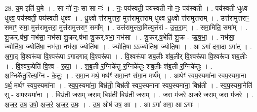 \documentclass[17pt]{extarticle}
\begin{document}
28. य॒म इति॑ य॒मे । . सा नो॑ नः॒ सा सा नः॑ । . नः॒ पय॑स्वती॒ पय॑स्वती नो नः॒ पय॑स्वती । . पय॑स्वती धुक्ष्व धुक्ष्व॒ पय॑स्वती॒ पय॑स्वती धुक्ष्व । . धु॒क्ष्वो त्त॑रामुत्तरा॒ मुत्त॑रामुत्तराम् धुक्ष्व धु॒क्ष्वो त्त॑रामुत्तराम् । . उत्त॑रामुत्तराꣳ॒॒ समाꣳ॒॒ समा॒ मुत्त॑रामुत्तरा॒ मुत्त॑रामुत्तराꣳ॒॒ समा᳚म् । . उत्त॑रामुत्तरा॒मित्युत्त॑रां - उ॒त्त॒रा॒म् । . समा॒मिति॒ समा᳚म् । . शु॒क्रर्.ष॑भा॒ नभ॑सा॒ नभ॑सा शु॒क्रर्.ष॑भा शु॒क्रर्.ष॑भा॒ नभ॑सा । . शु॒क्रर्.ष॒भेति॑ शु॒क्र - ऋ॒ष॒भा॒ । . नभ॑सा॒ ज्योति॑षा॒ ज्योति॑षा॒ नभ॑सा॒ नभ॑सा॒ ज्योति॑षा । . ज्योति॒षा ऽऽज्योति॑षा॒ ज्योति॒षा । . आ ऽगा॑ दगा॒दा ऽगा᳚त् । . अ॒गा॒द् वि॒श्वरू॑पा वि॒श्वरू॑पा ऽगादगाद् वि॒श्वरू॑पा । . वि॒श्वरू॑पा शब॒लीः श॑ब॒लीर् वि॒श्वरू॑पा वि॒श्वरू॑पा शब॒लीः । . वि॒श्वरू॒पेति॑ वि॒श्व - रू॒पा॒ । . श॒ब॒ली र॒ग्निके॑तु र॒ग्निके॑तुः शब॒लीः श॑ब॒ली र॒ग्निके॑तुः । . अ॒ग्निके॑तु॒रित्य॒ग्नि - के॒तुः॒ । . स॒मा॒न मर्थ॒ मर्थꣳ॑ समा॒नꣳ स॑मा॒न मर्थ᳚म् । . अर्थꣳ॑ स्वप॒स्यमा॑ना स्वप॒स्यमा॒ना ऽर्थ॒ मर्थꣳ॑ स्वप॒स्यमा॑ना । . स्व॒प॒स्यमा॑ना॒ बिभ्र॑ती॒ बिभ्र॑ती स्वप॒स्यमा॑ना स्वप॒स्यमा॑ना॒ बिभ्र॑ती । . स्व॒प॒स्यमा॒नेति॑ सु - अ॒प॒स्यमा॑ना । . बिभ्र॑ती ज॒राम् ज॒राम् बिभ्र॑ती॒ बिभ्र॑ती ज॒राम् । . ज॒रा म॑जरे अजरे ज॒राम् ज॒रा म॑जरे । . अ॒ज॒र॒ उ॒ष॒ उ॒षो॒ अ॒ज॒रे॒ अ॒ज॒र॒ उ॒षः॒ । . उ॒ष॒ ओष॑ उष॒ आ । . आ ऽगा॑ अगा॒ आ ऽगाः᳚ । \newline
\end{document}

